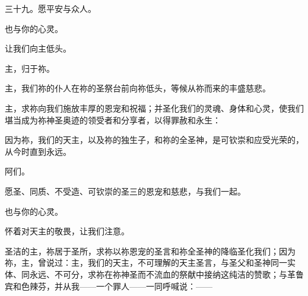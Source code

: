 \par

三十九。愿平安与众人。\par

\par

也与你的心灵。\par

\par

让我们向主低头。\par

\par

主，归于祢。\par

\par

主，我们祢的仆人在祢的圣祭台前向祢低头，等候从祢而来的丰盛慈悲。\par

主，求祢向我们施放丰厚的恩宠和祝福；并圣化我们的灵魂、身体和心灵，使我们堪当成为祢神圣奥迹的领受者和分享者，以得罪赦和永生：\par

\par

因为祢，我们的天主，以及祢的独生子，和祢的全圣神，是可钦崇和应受光荣的，从今时直到永远。\par

\par

阿们。\par

\par

愿圣、同质、不受造、可钦崇的圣三的恩宠和慈悲，与我们一起。\par

\par

也与你的心灵。\par

\par

怀着对天主的敬畏，让我们注意。\par

\par

圣洁的主，祢居于圣所，求祢以祢恩宠的圣言和祢全圣神的降临圣化我们；因为祢，主，曾说过：主，我们的天主，不可理解的天主圣言，与圣父和圣神同一实体、同永远、不可分，求祢在祢神圣而不流血的祭献中接纳这纯洁的赞歌；与革鲁宾和色辣芬，并从我——一个罪人——一同呼喊说：——\par

